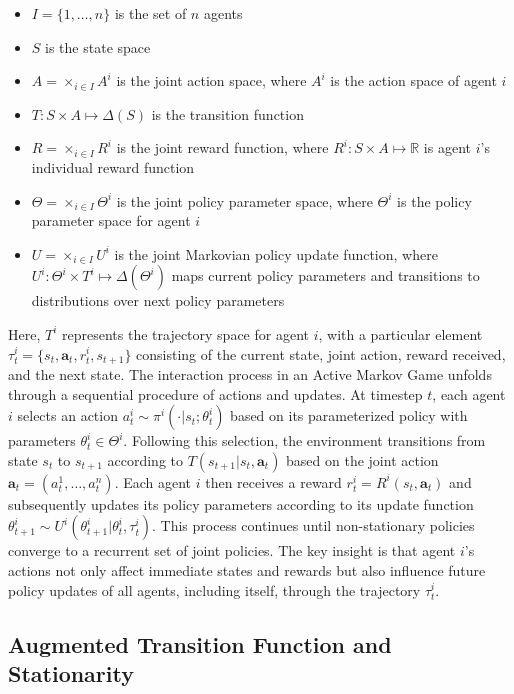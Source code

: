 \documentclass[a4paper,12pt]{report}
\begin{document}
\begin{itemize}
    \item $I = \{1, \ldots, n\}$ is the set of $n$ agents
    \item $S$ is the state space
    \item $A = \times_{i \in I} A^i$ is the joint action space, where $A^i$ is the action space of agent $i$
    \item $T: S \times A \mapsto \Delta(S)$ is the transition function
    \item $R = \times_{i \in I} R^i$ is the joint reward function, where $R^i: S \times A \mapsto \mathbb{R}$ is agent $i$'s individual reward function
    \item $\Theta = \times_{i \in I} \Theta^i$ is the joint policy parameter space, where $\Theta^i$ is the policy parameter space for agent $i$
    \item $U = \times_{i \in I} U^i$ is the joint Markovian policy update function, where $U^i: \Theta^i \times T^i \mapsto \Delta(\Theta^i)$ maps current policy parameters and transitions to distributions over next policy parameters
\end{itemize}
Here, $T^i$ represents the trajectory space for agent $i$, with a particular element $\tau^i_t = \{s_t, \mathbf{a}_t, r^i_t, s_{t+1}\}$ consisting of the current state, joint action, reward received, and the next state. The interaction process in an Active Markov Game unfolds through a sequential procedure of actions and updates. At timestep $t$, each agent $i$ selects an action $a^i_t \sim \pi^i(\cdot|s_t; \theta^i_t)$ based on its parameterized policy with parameters $\theta^i_t \in \Theta^i$. Following this selection, the environment transitions from state $s_t$ to $s_{t+1}$ according to $T(s_{t+1}|s_t, \mathbf{a}_t)$ based on the joint action $\mathbf{a}_t = (a^1_t, \ldots, a^n_t)$. Each agent $i$ then receives a reward $r^i_t = R^i(s_t, \mathbf{a}_t)$ and subsequently updates its policy parameters according to its update function $\theta^i_{t+1} \sim U^i(\theta^i_{t+1}|\theta^i_t, \tau^i_t)$. This process continues until non-stationary policies converge to a recurrent set of joint policies. The key insight is that agent $i$'s actions not only affect immediate states and rewards but also influence future policy updates of all agents, including itself, through the trajectory $\tau^i_t$.

\subsection{Augmented Transition Function and Stationarity}
\end{document}
